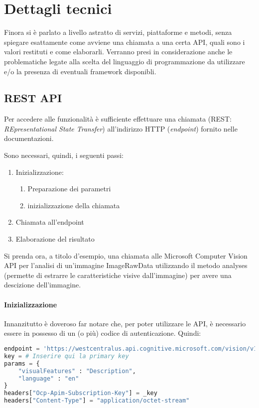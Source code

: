 
\section{Dettagli tecnici}\label{sec:dettagli-tecnici}
Finora si è parlato a livello astratto di servizi, piattaforme e metodi, senza spiegare esattamente come avviene
una chiamata a una certa API, quali sono i valori restituti e come elaborarli.
Verranno presi in considerazione anche le problematiche legate alla scelta del linguaggio di programmazione
da utilizzare e/o la presenza di eventuali framework disponibli.
%
\subsection{REST API}\label{subsec:rest-api}
Per accedere alle funzionalità è sufficiente effettuare una chiamata (REST: \textit{REpresentational State Transfer})
all'indirizzo HTTP (\textit{endpoint}) fornito nelle documentazioni.

Sono necessari, quindi, i seguenti passi:
\begin{enumerate}
	\item Inizializzazione:
	\begin{enumerate}
		\item Preparazione dei parametri
		\item inizializzazione della chiamata
	\end{enumerate}
	\item Chiamata all'endpoint
	\item Elaborazione del risultato
\end{enumerate}

Si prenda ora, a titolo d'esempio, una chiamata alle Microsoft Computer Vision API
per l'analisi di un'immagine \textsf{ImageRawData} utilizzando il metodo \textsf{analyses}
(permette di estrarre le caratteristiche visive dall'immagine) per avere una descizione
dell'immagine.
%
\paragraph{Inizializzazione}
Innanzitutto è doveroso far notare che, per poter utilizzare le API, è necessario
essere in possesso di un (o più) codice di autenticazione.
Quindi:
%
\begin{lstlisting}[language=Python,style=mystyle]
endpoint = 'https://westcentralus.api.cognitive.microsoft.com/vision/v1/analyses'
key = # Inserire qui la primary key
params = {
	"visualFeatures" : "Description",
	"language" : "en"
}
headers["Ocp-Apim-Subscription-Key"] = _key
headers["Content-Type"] = "application/octet-stream"
\end{lstlisting}
%
